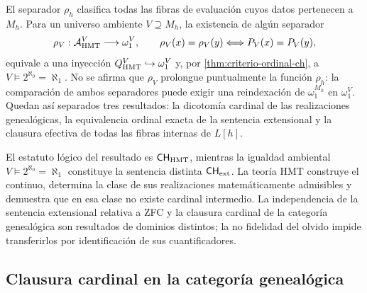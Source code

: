 El separador \(\rho_h\) clasifica todas las fibras de evaluación cuyos
datos pertenecen a \(M_h\). Para un universo ambiente
\(V\supseteq M_h\), la existencia de algún separador
\begin{equation}
 \rho_V:\mathcal A_{\rm HMT}^V\longrightarrow\omega_1^V,
 \qquad
 \rho_V(x)=\rho_V(y)\Longleftrightarrow P_V(x)=P_V(y),
 \label{eq:separador-ordinal-ambiente}
\end{equation}
equivale a una inyección
\(Q_{\rm HMT}^V\hookrightarrow\omega_1^V\) y, por
\cref{thm:criterio-ordinal-ch}, a
\(V\models2^{\aleph_0}=\aleph_1\). No se afirma que \(\rho_V\) prolongue
puntualmente la función \(\rho_h\): la comparación de ambos separadores
puede exigir una reindexación de \(\omega_1^{M_h}\) en \(\omega_1^V\).
Quedan así separados tres resultados:
la dicotomía cardinal de las realizaciones genealógicas, la equivalencia
ordinal exacta de la sentencia extensional y la clausura efectiva de todas
las fibras internas de \(L[h]\).

El estatuto l\'ogico del resultado es
\(\mathsf{CH}_{\rm HMT}\), mientras la igualdad ambiental
\(V\models2^{\aleph_0}=\aleph_1\) constituye la sentencia distinta
\(\mathsf{CH}_{\rm ext}\). La teor\'ia HMT construye el continuo, determina la clase de sus
realizaciones matem\'aticamente admisibles y demuestra que en esa clase no
existe cardinal intermedio. La independencia de la sentencia extensional
relativa a ZFC y la clausura cardinal de la categor\'ia geneal\'ogica son
resultados de dominios distintos; la no fidelidad del olvido impide
transferirlos por identificaci\'on de sus cuantificadores.

\subsection{Clausura cardinal en la categoría genealógica}

